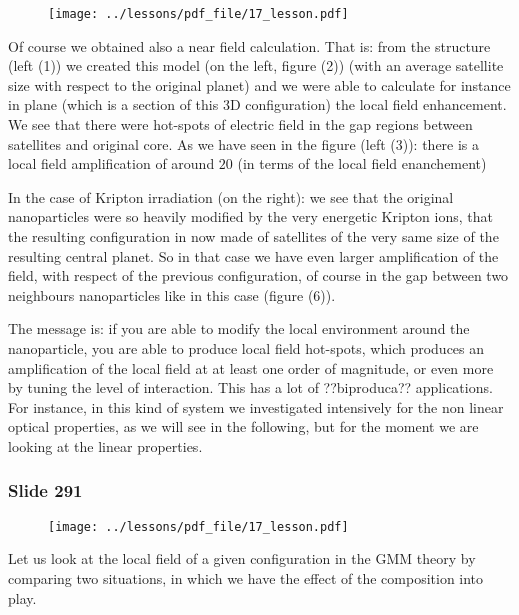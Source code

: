 \documentclass[../main/main.tex]{subfiles}
\begin{document}
\begin{figure}[h!]
\centering
\texttt{[image: ../lessons/pdf\_file/17\_lesson.pdf]}
\end{figure}

Of course we obtained also a near field calculation. That is: from the structure (left (1)) we created this model (on the left, figure (2)) (with an average satellite size with respect to the original planet) and we were able to calculate for instance in plane (which is a section of this 3D configuration) the local field enhancement. We see that there were hot-spots of electric field in the gap regions between satellites and original core. As we have seen in the figure (left (3)): there is a local field amplification of around $20$ (in terms of the local field enanchement)

In the case of Kripton irradiation (on the right): we see that the original nanoparticles were so heavily modified by the very energetic Kripton ions, that the resulting configuration in now made of satellites of the very same size of the resulting central planet. So in that case we have even larger amplification of the field, with respect of the previous configuration, of course in the gap between two neighbours nanoparticles like in this case (figure (6)).

The message is: if you are able to modify the local environment around the nanoparticle, you are able to produce local field hot-spots, which produces an amplification of the local field at at least one order of magnitude, or even more by tuning the level of interaction.
This has a lot of ??biproduca?? applications. For instance, in this kind of system we investigated intensively for the non linear optical properties, as we will see in the following, but for the moment we are looking at the linear properties.


\newpage

\subsubsection{Slide 291}

\begin{figure}[h!]
\centering
\texttt{[image: ../lessons/pdf\_file/17\_lesson.pdf]}
\end{figure}

Let us look at the local field of a given configuration in the GMM theory by comparing two situations, in which we have the effect of the composition into play.
\end{document}
